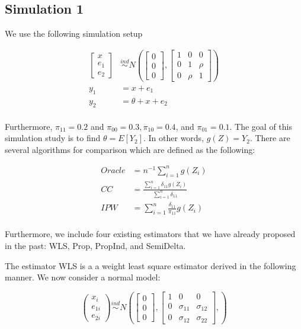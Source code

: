 \documentclass[
  letterpaper,
  DIV=11,
  numbers=noendperiod]{scrartcl}
\begin{document}
\hypertarget{simulation-1}{%
\subsection*{Simulation 1}\label{simulation-1}}

We use the following simulation setup

\begin{align*}
  \begin{bmatrix} x \\ e_1 \\ e_2 \end{bmatrix} 
  &\stackrel{ind}{\sim} N\left(\begin{bmatrix} 0 \\ 0 \\ 0 \end{bmatrix}, 
  \begin{bmatrix} 1 & 0 & 0 \\ 0 & 1 & \rho \\ 0 & \rho & 1 \end{bmatrix}\right) \\
  y_1 &= x + e_1 \\
  y_2 &= \theta + x + e_2 \\
\end{align*}

Furthermore, \(\pi_{11} = 0.2\) and \(\pi_{00} = 0.3, \pi_{10} = 0.4\),
and \(\pi_{01} = 0.1\). The goal of this simulation study is to find
\(\theta = E[Y_2]\). In other words, \(g(Z) = Y_2\). There are several
algorithms for comparison which are defined as the following:

\begin{align*}
  Oracle &= n^{-1} \sum_{i = 1}^n g(Z_i)\\
  CC &= \frac{\sum_{i = 1}^n \delta_{11} g(Z_i)}{\sum_{i = 1}^n \delta_{11}} \\
  IPW &= \sum_{i = 1}^n \frac{\delta_{11}}{\pi_{11}} g(Z_i)\\
\end{align*}

Furthermore, we include four existing estimators that we have already
proposed in the past: WLS, Prop, PropInd, and SemiDelta.

The estimator WLS is a a weight least square estimator derived in the
following manner. We now consider a normal model:

\[ 
  \begin{pmatrix}
    x_i \\ e_{1i} \\ e_{2i}
  \end{pmatrix} \stackrel{ind}{\sim}
  N \left(
  \begin{bmatrix}
    0 \\ 0 \\ 0
  \end{bmatrix},
  \begin{bmatrix}
    1 & 0 & 0 \\
    0 & \sigma_{11} & \sigma_{12} \\ 
    0 & \sigma_{12} & \sigma_{22}
  \end{bmatrix},
  \right)
\]
\end{document}

